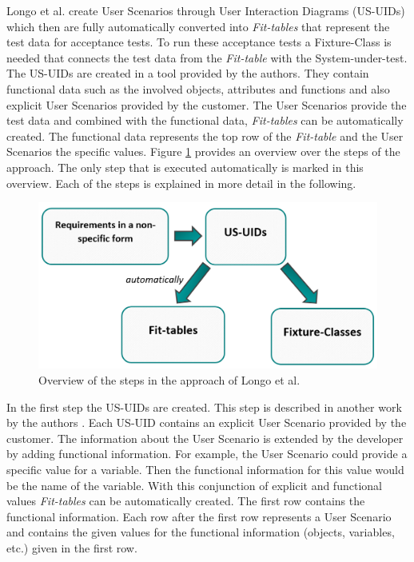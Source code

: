 Longo et al. \cite{longo} create User Scenarios through User Interaction Diagrams (US-UIDs) which then are fully automatically converted into \textit{Fit-tables} that represent the test data for acceptance tests.
To run these acceptance tests a Fixture-Class is needed that connects the test data from the \textit{Fit-table} with the System-under-test.
The US-UIDs are created in a tool provided by the authors.
They contain functional data such as the involved objects, attributes and functions and also explicit User Scenarios provided by the customer.
The User Scenarios provide the test data and combined with the functional data, \textit{Fit-tables} can be automatically created.
The functional data represents the top row of the \textit{Fit-table} and the User Scenarios the specific values.
Figure \ref{fig:overview-longo} provides an overview over the steps of the approach.
The only step that is executed automatically is marked in this overview.
Each of the steps is explained in more detail in the following.


\begin{figure}[H]
	\centering
	\includegraphics[width=.62\textwidth]{../images/LongoProcess.png}
	\caption{Overview of the steps in the approach of Longo et al.}
	\label{fig:overview-longo}
\end{figure}

In the first step the US-UIDs are created.
This step is described in another work by the authors \cite{longo2}.
Each US-UID contains an explicit User Scenario provided by the customer.
The information about the User Scenario is extended by the developer by adding functional information.
For example, the User Scenario could provide a specific value for a variable.
Then the functional information for this value would be the name of the variable.
With this conjunction of explicit and functional values \textit{Fit-tables} can be automatically created.
The first row contains the functional information.
Each row after the first row represents a User Scenario and contains the given values for the functional information (objects, variables, etc.) given in the first row.


